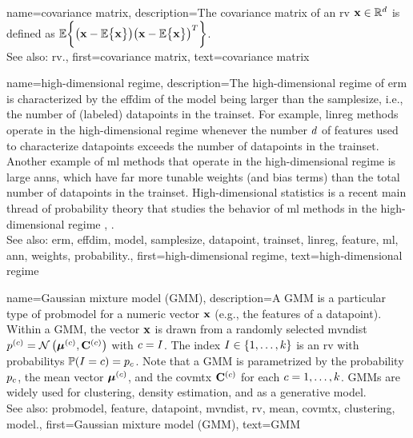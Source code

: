 {name={covariance matrix}, 
	description={The covariance matrix of an \gls{rv} ${\bf x} \in \mathbb{R}^{d}$ 
		is defined as $\mathbb{E} \bigg \{ \big( {\bf x} - \mathbb{E} \big\{ {\bf x} \big\} \big)  \big({\bf x} - \mathbb{E} \big\{ {\bf x} \big\} \big)^{T} \bigg\}$.
				\\
		See also: \gls{rv}.},
	first={covariance matrix},
	text={covariance matrix} 
}
	
{name={high-dimensional regime}, 
	description={The 
		high-dimensional regime of \gls{erm} is characterized by the \gls{effdim} of the \gls{model} 
		being larger than the \gls{samplesize}, i.e., the number of (labeled) \glspl{datapoint} in the \gls{trainset}. 
		For example, \gls{linreg} methods operate in the high-dimensional regime whenever the number $d$ of \glspl{feature} 
		used to characterize \glspl{datapoint} exceeds the number of \glspl{datapoint} in the \gls{trainset}. 
		Another example of \gls{ml} methods that operate in the high-dimensional regime is large \glspl{ann}, which have 
		far more tunable \gls{weights} (and bias terms) than the total number of \glspl{datapoint} in the \gls{trainset}. 
		High-dimensional statistics is a recent main thread of \gls{probability} theory that studies the 
		behavior of \gls{ml} methods in the high-dimensional regime \cite{Wain2019}, \cite{BuhlGeerBook}.
				\\
		See also: \gls{erm}, \gls{effdim}, \gls{model}, \gls{samplesize}, \gls{datapoint}, \gls{trainset}, \gls{linreg}, \gls{feature}, \gls{ml}, \gls{ann}, \gls{weights}, \gls{probability}.},
   	first={high-dimensional regime},
	text={high-dimensional regime} 
}

{name={Gaussian mixture model (GMM)}, 
	description={A GMM 
		is a particular type of \gls{probmodel} for a numeric vector ${\bf x}$ (e.g., 
		the \glspl{feature} of a \gls{datapoint}). Within a GMM, the vector ${\bf x}$ is drawn from a randomly 
		selected \gls{mvndist} $p^{(c)} = \mathcal{N}\left({\bm \mu}^{(c)},\mathbf{C}^{(c)}\right)$ with 
		$c = I$. The index $I \in \{1,\ldots,k\}$ is an \gls{rv} with \glspl{probability} $\mathbb{P}({I=c}) = p_{c}$.
	     	Note that a GMM is parametrized by the \gls{probability} $p_{c}$, the 
		\gls{mean} vector ${\bm \mu}^{(c)}$, and the \gls{covmtx} $\mathbf{C}^{(c)}$ for each $c=1,\ldots,k$. 
		GMMs are widely used for \gls{clustering}, density estimation, and as a generative \gls{model}. 
				\\
		See also: \gls{probmodel}, \gls{feature}, \gls{datapoint}, \gls{mvndist}, \gls{rv}, \gls{mean}, \gls{covmtx}, \gls{clustering}, \gls{model}.},
	first={Gaussian mixture model (GMM)},
	text={GMM} 
}
 
